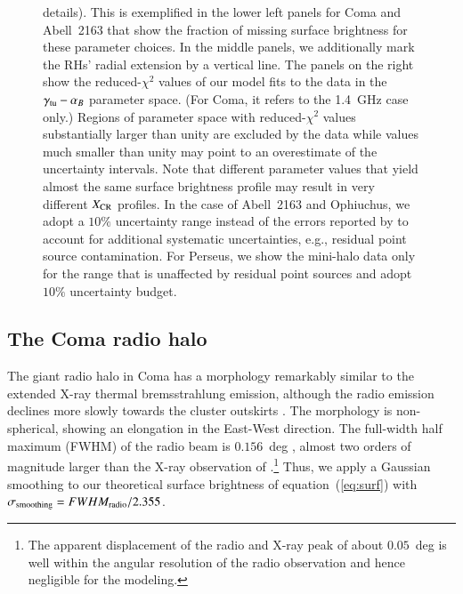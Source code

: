 \documentclass[useAMS,usenatbib]{mn2e}
\def\del#1{{}}
\begin{document}
\begin{figure}
{  details). This is exemplified in the lower left panels for Coma and Abell~2163
  that show the fraction of missing surface brightness for these parameter
  choices. In the middle panels, we additionally mark the RHs' radial extension
  by a vertical line. The panels on the right show the reduced-$\chi^2$ values
  of our model fits to the data in the $\gamma_{{\mathrm{tu}}}-\alpha_{B}$ parameter
  space. (For Coma, it refers to the 1.4~GHz case only.)  Regions of parameter
  space with reduced-$\chi^2$ values substantially larger than unity are
  excluded by the data while values much smaller than unity may point to an
  overestimate of the uncertainty intervals. Note that different parameter
  values that yield almost the same surface brightness profile may result in
  very different $X_{{\mathrm{CR}}}$ profiles. In the case of Abell~2163 and
  Ophiuchus, we adopt a $10\%$ uncertainty range instead of the errors reported
  by \citet{2009A&A...499..679M} to account for additional systematic
  uncertainties, e.g., residual point source contamination. For Perseus, we show
  the mini-halo data only for the range that is unaffected by residual point
  sources \citep{1990MNRAS.246..477P} and adopt $10\%$ uncertainty budget.}
\label{fig:SBmodeling}
\end{figure}


\del{ We adopt a $10\%$ uncertainty range for the inner points of the Coma
  $352$~MHz data.}

\subsection{The Coma radio halo}

The giant radio halo in Coma has a morphology remarkably similar to the extended
X-ray thermal bremsstrahlung emission, although the radio emission declines more
slowly towards the cluster outskirts \citep{1992A&A...259L..31B,
  1997A&A...321...55D}. The morphology is non-spherical, showing an elongation
in the East-West direction.  The full-width half maximum (FWHM) of the radio
beam is $0.156$~deg \citep{1997A&A...321...55D}, almost two orders of magnitude
larger than the X-ray observation of \cite{1992A&A...259L..31B}.\footnote{The
  apparent displacement of the radio and X-ray peak of about $0.05$~deg is well
  within the angular resolution of the radio observation and hence negligible
  for the modeling.}  Thus, we apply a Gaussian smoothing to our theoretical
surface brightness of equation~(\ref{eq:surf}) with $\sigma_{{\mathrm{smoothing}}} =
FWHM_{{\mathrm{radio}}}/2.355$.
\end{document}
